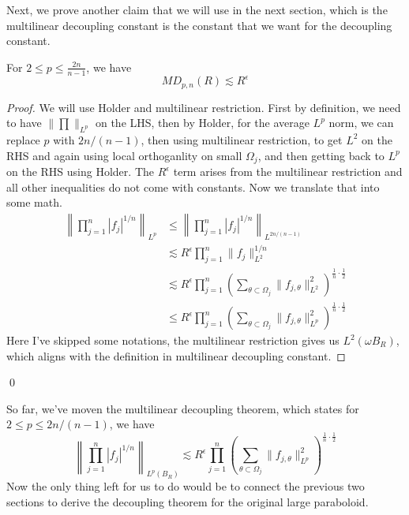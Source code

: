 Next, we prove another claim that we will use in the next section, which is the multilinear decoupling constant is the constant that we want for the decoupling constant.
\begin{proposition}
    For $2\leq p\leq\frac{2n}{n-1}$, we have
    \begin{equation*}
        MD_{p,n}(R)\lesssim R^\epsilon
    \end{equation*}
\end{proposition}
\begin{proof}
    We will use Holder and multilinear restriction. First by definition, we need to have $\|\prod\|_{L^p}$ on the LHS, then by Holder, for the average $L^p$ norm, we can replace $p$ with $2n/(n-1)$, then using multilinear restriction, to get $L^2$ on the RHS and again using local orthoganlity on small $\Omega_j$, and then getting back to $L^p$ on the RHS using Holder. The $R^\epsilon$ term arises from the multilinear restriction and all other inequalities do not come with constants.
    Now we translate that into some math.
    \begin{align*}
        \left\|\prod_{j=1}^n|f_j|^{1/n} \right\|_{L^p}&\leq \left\|\prod_{j=1}^n|f_j|^{1/n} \right\|_{L^{2n/(n-1)}}\\
        &\lesssim R^\epsilon\prod_{j=1}^n\|f_j\|_{L^2}^{1/n}\\
        &\lesssim R^\epsilon\prod_{j=1}^n\left(\sum_{\theta\subset\Omega_j}\|f_{j,\theta}\|_{L^2}^2 \right)^{\frac{1}{n}\cdot\frac{1}{2}}\\
        &\leq R^\epsilon\prod_{j=1}^n\left(\sum_{\theta\subset\Omega_j}\|f_{j,\theta}\|_{L^p}^2 \right)^{\frac{1}{n}\cdot\frac{1}{2}}
    \end{align*}
    Here I've skipped some notations, the multilinear restriction gives us $L^2(\omega B_R)$, which aligns with the definition in multilinear decoupling constant.
\end{proof}
\qed

So far, we've moven the multilinear decoupling theorem, which states for $2\leq p\leq 2n/(n-1)$, we have
\begin{equation*}
    \left\|\prod_{j=1}^n|f_j|^{1/n} \right\|_{L^p(B_R)}\lesssim R^\epsilon\prod_{j=1}^n\left(\sum_{\theta\subset\Omega_j}\|f_{j,\theta}\|_{L^p}^2 \right)^{\frac{1}{n}\cdot\frac{1}{2}}
\end{equation*}
Now the only thing left for us to do would be to connect the previous two sections to derive the decoupling theorem for the original large paraboloid.

